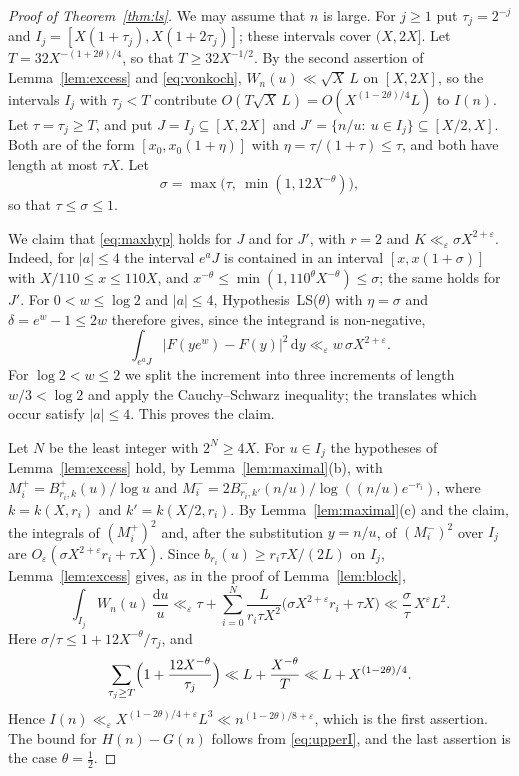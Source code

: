 \documentclass[11pt,reqno]{amsart}
\theoremstyle{definition}
\theoremstyle{remark}
\numberwithin{equation}{section}
\newcommand{\dd}{\mathrm{d}}
\newcommand{\eps}{\varepsilon}
\begin{document}
\begin{proof}[Proof of Theorem~\ref{thm:ls}]
We may assume that $n$ is large. For $j\ge1$ put $\tau_j=2^{-j}$ and $I_j=[X(1+\tau_j),X(1+2\tau_j)]$; these intervals cover $(X,2X]$. Let $T=32X^{-(1+2\theta)/4}$, so that $T\ge32X^{-1/2}$. By the second assertion of Lemma~\ref{lem:excess} and \eqref{eq:vonkoch}, $W_n(u)\ll\sqrt X\,L$ on $[X,2X]$, so the intervals $I_j$ with $\tau_j<T$ contribute $O(T\sqrt X\,L)=O(X^{(1-2\theta)/4}L)$ to $I(n)$. Let $\tau=\tau_j\ge T$, and put $J=I_j\subseteq[X,2X]$ and $J'=\{n/u:\ u\in I_j\}\subseteq[X/2,X]$. Both are of the form $[x_0,x_0(1+\eta)]$ with $\eta=\tau/(1+\tau)\le\tau$, and both have length at most $\tau X$. Let
\[
 \sigma=\max\bigl(\tau,\ \min(1,12X^{-\theta})\bigr),
\]
so that $\tau\le\sigma\le1$.

We claim that \eqref{eq:maxhyp} holds for $J$ and for $J'$, with $r=2$ and $K\ll_\eps\sigma X^{2+\eps}$. Indeed, for $|a|\le4$ the interval $e^aJ$ is contained in an interval $[x,x(1+\sigma)]$ with $X/110\le x\le110X$, and $x^{-\theta}\le\min(1,110^{\theta}X^{-\theta})\le\sigma$; the same holds for $J'$. For $0<w\le\log2$ and $|a|\le4$, Hypothesis~LS($\theta$) with $\eta=\sigma$ and $\delta=e^w-1\le2w$ therefore gives, since the integrand is non-negative,
\[
 \int_{e^aJ}\bigl|F(ye^w)-F(y)\bigr|^2\,\dd y\ll_\eps w\,\sigma X^{2+\eps}.
\]
For $\log2<w\le2$ we split the increment into three increments of length $w/3<\log2$ and apply the Cauchy--Schwarz inequality; the translates which occur satisfy $|a|\le4$. This proves the claim.

Let $N$ be the least integer with $2^N\ge4X$. For $u\in I_j$ the hypotheses of Lemma~\ref{lem:excess} hold, by Lemma~\ref{lem:maximal}(b), with $M_i^+=B^+_{r_i,k}(u)/\log u$ and $M_i^-=2B^-_{r_i,k'}(n/u)/\log((n/u)e^{-r_i})$, where $k=k(X,r_i)$ and $k'=k(X/2,r_i)$. By Lemma~\ref{lem:maximal}(c) and the claim, the integrals of $(M_i^+)^2$ and, after the substitution $y=n/u$, of $(M_i^-)^2$ over $I_j$ are $O_\eps(\sigma X^{2+\eps}r_i+\tau X)$. Since $b_{r_i}(u)\ge r_i\tau X/(2L)$ on $I_j$, Lemma~\ref{lem:excess} gives, as in the proof of Lemma~\ref{lem:block},
\[
 \int_{I_j}W_n(u)\,\frac{\dd u}{u}\ll_\eps\tau+\sum_{i=0}^{N}\frac{L}{r_i\tau X^2}\bigl(\sigma X^{2+\eps}r_i+\tau X\bigr)\ll\frac{\sigma}{\tau}\,X^{\eps}L^2 .
\]
Here $\sigma/\tau\le1+12X^{-\theta}/\tau_j$, and
\[
 \sum_{\tau_j\ge T}\Bigl(1+\frac{12X^{-\theta}}{\tau_j}\Bigr)\ll L+\frac{X^{-\theta}}{T}\ll L+X^{(1-2\theta)/4}.
\]
Hence $I(n)\ll_\eps X^{(1-2\theta)/4+\eps}L^3\ll n^{(1-2\theta)/8+\eps}$, which is the first assertion. The bound for $H(n)-G(n)$ follows from \eqref{eq:upperI}, and the last assertion is the case $\theta=\frac12$.
\end{proof}
\end{document}

